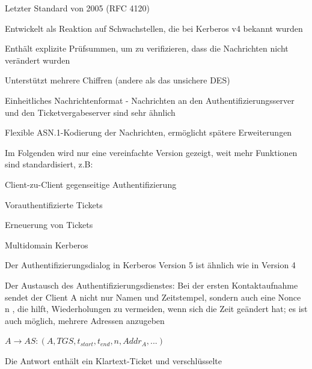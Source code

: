 \documentclass[a4paper]{article}
\begin{document}
\begin{multicols}{3}
      \begin{itemize*}
            \item Letzter Standard von 2005 (RFC 4120)
            \item Entwickelt als Reaktion auf Schwachstellen, die bei Kerberos v4
            bekannt wurden
            \begin{itemize*}
                  \item Enthält explizite Prüfsummen, um zu verifizieren, dass die Nachrichten nicht verändert wurden
                  \item Unterstützt mehrere Chiffren (andere als das unsichere DES)
            \end{itemize*}
            \item Einheitliches Nachrichtenformat - Nachrichten an den
            Authentifizierungsserver und den Ticketvergabeserver sind sehr ähnlich
            \item Flexible ASN.1-Kodierung der Nachrichten, ermöglicht spätere
            Erweiterungen
            \item Im Folgenden wird nur eine vereinfachte Version gezeigt, weit mehr
            Funktionen sind standardisiert, z.B:
            \begin{itemize*}
                  \item Client-zu-Client gegenseitige Authentifizierung
                  \item Vorauthentifizierte Tickets
                  \item Erneuerung von Tickets
                  \item Multidomain Kerberos
            \end{itemize*}
            \item Der Authentifizierungsdialog in Kerberos Version 5 ist ähnlich wie in
            Version 4
            \item Der Austausch des Authentifizierungsdienstes: Bei der ersten
            Kontaktaufnahme sendet der Client A nicht nur Namen und Zeitstempel,
            sondern auch eine Nonce n , die hilft, Wiederholungen zu vermeiden,
            wenn sich die Zeit geändert hat; es ist auch möglich, mehrere Adressen
            anzugeben
            \begin{enumerate*}
                  \def\labelenumi{\arabic{enumi}.}
                  \item $A\rightarrow AS:(A,TGS,t_{start},t_{end},n,Addr_A, ...)$
            \end{enumerate*}
            \item Die Antwort enthält ein Klartext-Ticket und verschlüsselte

\end{itemize*}
\end{multicols}
\end{document}
